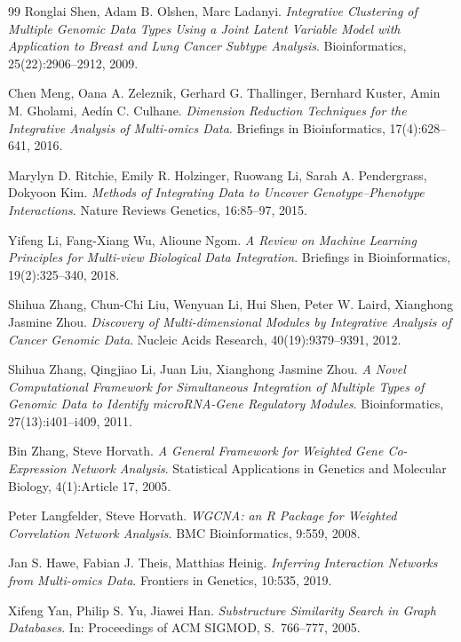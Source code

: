 \documentclass[a4paper,12pt, twoside]{report}
\theoremstyle{definition}
\begin{document}
\begin{thebibliography}{99}
Ronglai Shen, Adam B. Olshen, Marc Ladanyi.
\emph{Integrative Clustering of Multiple Genomic Data Types Using a Joint Latent Variable Model with Application to Breast and Lung Cancer Subtype Analysis}.
Bioinformatics, 25(22):2906--2912, 2009.

Chen Meng, Oana A. Zeleznik, Gerhard G. Thallinger, Bernhard Kuster, Amin M. Gholami, Aedín C. Culhane.
\emph{Dimension Reduction Techniques for the Integrative Analysis of Multi-omics Data}.
Briefings in Bioinformatics, 17(4):628--641, 2016.

Marylyn D. Ritchie, Emily R. Holzinger, Ruowang Li, Sarah A. Pendergrass, Dokyoon Kim.
\emph{Methods of Integrating Data to Uncover Genotype--Phenotype Interactions}.
Nature Reviews Genetics, 16:85--97, 2015.

Yifeng Li, Fang-Xiang Wu, Alioune Ngom.
\emph{A Review on Machine Learning Principles for Multi-view Biological Data Integration}.
Briefings in Bioinformatics, 19(2):325--340, 2018.

Shihua Zhang, Chun-Chi Liu, Wenyuan Li, Hui Shen, Peter W. Laird, Xianghong Jasmine Zhou.
\emph{Discovery of Multi-dimensional Modules by Integrative Analysis of Cancer Genomic Data}.
Nucleic Acids Research, 40(19):9379--9391, 2012.

Shihua Zhang, Qingjiao Li, Juan Liu, Xianghong Jasmine Zhou.
\emph{A Novel Computational Framework for Simultaneous Integration of Multiple Types of Genomic Data to Identify microRNA-Gene Regulatory Modules}.
Bioinformatics, 27(13):i401--i409, 2011.

Bin Zhang, Steve Horvath.
\emph{A General Framework for Weighted Gene Co-Expression Network Analysis}.
Statistical Applications in Genetics and Molecular Biology, 4(1):Article 17, 2005.

Peter Langfelder, Steve Horvath.
\emph{WGCNA: an R Package for Weighted Correlation Network Analysis}.
BMC Bioinformatics, 9:559, 2008.

Jan S. Hawe, Fabian J. Theis, Matthias Heinig.
\emph{Inferring Interaction Networks from Multi-omics Data}.
Frontiers in Genetics, 10:535, 2019.


Xifeng Yan, Philip S. Yu, Jiawei Han.
\emph{Substructure Similarity Search in Graph Databases}.
In: Proceedings of ACM SIGMOD, S.~766--777, 2005.


\end{thebibliography}
\end{document}
